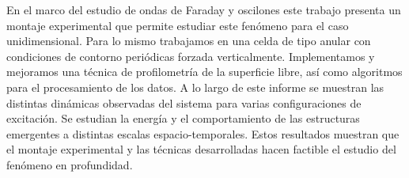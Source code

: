 \documentclass[../main.tex]{subfiles}
\begin{document}
En el marco del estudio de ondas de Faraday y oscilones este trabajo presenta un montaje experimental que permite estudiar este fenómeno para el caso unidimensional. Para lo mismo trabajamos en una celda de tipo anular con condiciones de contorno periódicas forzada verticalmente. Implementamos y mejoramos una técnica de profilometría de la superficie libre, así como algoritmos para el procesamiento de los datos. A lo largo de este informe se muestran las distintas dinámicas observadas del sistema para varias configuraciones de excitación.
Se estudian la energía y el comportamiento de las estructuras emergentes a distintas escalas espacio-temporales. 
Estos resultados muestran que el montaje experimental y las técnicas desarrolladas hacen factible el estudio del fenómeno en profundidad.
\end{document}

